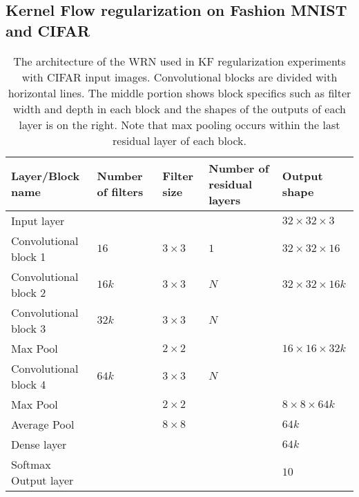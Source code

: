 \documentclass[11pt]{article}
\begin{document}
\subsection{Kernel Flow regularization on Fashion MNIST and CIFAR}

\begin{table}
{\scriptsize
\begin{center}
\begin{tabular}{ | p{3.8cm} || p{1.9cm} p{1.9cm} p{2.3cm} | p{2.5cm} |}
\hline
\textbf{Layer/Block name} & \textbf{Number of filters} & \textbf{Filter size} & \textbf{Number of residual layers} & \textbf{Output shape} \\
\hline
Input layer & & & & $32 \times 32 \times 3$\\
\hline
Convolutional block 1 & $16$ & $3 \times 3$ & $1$ & $32 \times 32 \times 16$\\
\hline
Convolutional block 2 & $16k$ & $3 \times 3$ & $N$ & $32 \times 32 \times 16k$\\
\hline
Convolutional block 3 & $32k$ & $3 \times 3$ & $N$ & \\
Max Pool & & $2 \times 2$ & & $16 \times 16 \times 32k$\\
\hline
Convolutional block 4 & $64k$ & $3 \times 3$ & $N$ & \\
Max Pool & & $2 \times 2$ & & $8 \times 8 \times 64k$ \\
Average Pool & & $8 \times 8$ & & $64k$\\
\hline
Dense layer & & & & $64k$\\
\hline
Softmax Output layer & & & & $10$\\
\hline
\end{tabular}
\end{center}}
\caption{The architecture of the WRN used in KF regularization experiments with CIFAR input images.  Convolutional blocks are divided with horizontal lines.  The middle portion shows block specifics such as filter width and depth in each block and the shapes of the outputs of each layer is on the right.  Note that max pooling occurs within the last residual layer of each block.}\label{WRN arch}
\end{table}
\end{document}
